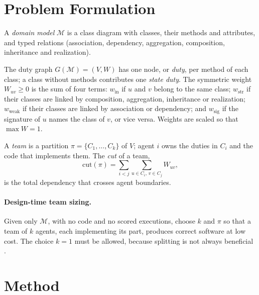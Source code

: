 \section{Problem Formulation}
\label{sec:problem}

A \emph{domain model} $\mathcal{M}$ is a class diagram with classes, their methods and attributes, and typed relations (association, dependency, aggregation, composition, inheritance and realization).

\begin{definition}
The duty graph $G(\mathcal{M}) = (V, W)$ has one node, or \emph{duty}, per method of each class; a class without methods contributes one \emph{state duty}. The symmetric weight $W_{uv} \ge 0$ is the sum of four terms: $w_{\text{in}}$ if $u$ and $v$ belong to the same class; $w_{\text{str}}$ if their classes are linked by composition, aggregation, inheritance or realization; $w_{\text{weak}}$ if their classes are linked by association or dependency; and $w_{\text{sig}}$ if the signature of $u$ names the class of $v$, or vice versa. Weights are scaled so that $\max W = 1$.
\end{definition}

A \emph{team} is a partition $\pi = \{C_1, \dots, C_k\}$ of $V$; agent $i$ owns the duties in $C_i$ and the code that implements them. The \emph{cut} of a team,
\begin{equation}
\mathrm{cut}(\pi) = \sum_{i<j} \sum_{u \in C_i,\, v \in C_j} W_{uv},
\label{eq:cut}
\end{equation}
is the total dependency that crosses agent boundaries.

\paragraph{Design-time team sizing.} Given only $\mathcal{M}$, with no code and no scored executions, choose $k$ and $\pi$ so that a team of $k$ agents, each implementing its part, produces correct software at low cost. The choice $k = 1$ must be allowed, because splitting is not always beneficial \citep{jwalapuram2026illusion}.

\section{Method}
\label{sec:method}

